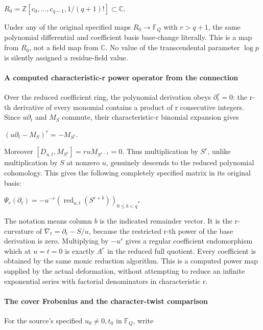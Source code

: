 \(R_0=\mathbb Z[c_0,\ldots,c_{q-1},1/(q+1)!]\subset\mathbb C\).

Under any of the original specified maps \(R_0\to\mathbb F_Q\) with \(r>q+1\), the same polynomial differential and coefficient basis base-change literally. This is a map from \(R_0\), not a field map from \(\mathbb C\). No value of the transcendental parameter \(\log p\) is silently assigned a residue-field value.

\paragraph{A computed characteristic-r power operator from the connection}\label{endpoint-f1_scaling--a-computed-characteristic-r-power-operator-from-the-connection}

Over the reduced coefficient ring, the polynomial derivation obeys \(\partial_t^r=0\): the r-th derivative of every monomial contains a product of r consecutive integers. Since \(u \partial_t\) and \(M_S\) commute, their characteristic-r binomial expansion gives

\((u \partial_t-M_S)^r=-M_{S^r}\).

Moreover \([D_{u,t},M_{S^r}]=r u M_{S^{r-1}}=0\). Thus multiplication by \(S^r\), unlike multiplication by \(S\) at nonzero \(u\), genuinely descends to the reduced polynomial cohomology. This gives the following completely specified matrix in its original basis:

\textbf{\(\Psi_r(\partial_t)=-u^{-r} (\operatorname{red}_{u,t}(S^{r+b}))_{0\le b<q}\).}

The notation means column \(b\) is the indicated remainder vector. It is the r-curvature of \(\nabla_t=\partial_t-S/u\), because the restricted r-th power of the base derivation is zero. Multiplying by \(-u^r\) gives a regular coefficient endomorphism which at \(u=t=0\) is exactly \(A^r\) in the reduced full quotient. Every coefficient is obtained by the same monic reduction algorithm. This is a computed power map supplied by the actual deformation, without attempting to reduce an infinite exponential series with factorial denominators in characteristic r.

\paragraph{The cover Frobenius and the character-twist comparison}\label{endpoint-f1_scaling--the-cover-frobenius-and-the-character-twist-comparison}

For the source's specified \(u_0\ne 0,t_0\) in \(\mathbb F_Q\), write

